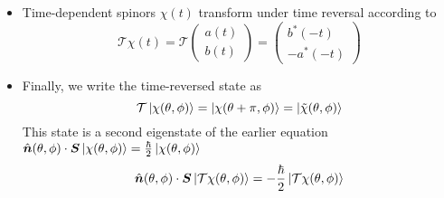 \documentclass[11pt, a4paper]{article}
\renewcommand{\vec}[1]{\bm{#1}}  %
\newcommand{\uvec}[1]{\hat{\vec{#1}}}  %
\renewcommand{\t}[1]{\tilde{#1}}
\renewcommand{\S}{\vec{S}}  %
\newcommand{\T}{\mathcal{T}}  %
\begin{document}
\begin{itemize}
	\item Time-dependent spinors $ \chi(t) $ transform under time reversal according to
	\begin{equation*}
		\T\chi(t) = \T
		\begin{pmatrix}
		a(t)\\
		b (t)
		\end{pmatrix}
		=
		\begin{pmatrix}
		b^{*}(-t) \\
		-a^{*}(-t)
		\end{pmatrix}
	\end{equation*}
	
	\item Finally, we write the time-reversed state as
	\begin{equation*}
		\T \ket{\chi(\theta, \phi)} = \ket{\chi(\theta + \pi, \phi)} = \ket{\t{\chi}(\theta, \phi)}
	\end{equation*}
	This state is a second eigenstate of the earlier equation $ \uvec{n}(\theta, \phi) \cdot \S \ket{\chi(\theta, \phi)} = \frac{\hbar}{2} \ket{\chi(\theta, \phi)} $
	\begin{equation*}
		\uvec{n}(\theta, \phi) \cdot \S \ket{\T\chi(\theta, \phi)} = -\frac{\hbar}{2} \ket{\T \chi(\theta, \phi)}
	\end{equation*}
	
\end{itemize}
\end{document}
